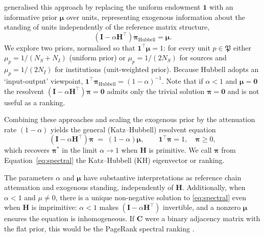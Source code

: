 \textcite{hubbellInputoutputApproachClique1965} generalised this approach by replacing
the uniform endowment $\mathbf{1}$ with an informative prior
$\boldsymbol{\mu}$ over units, representing exogenous information about
the standing of units independently of the reference matrix structure,
\[
	(\mathbf{I} - \alpha\mathbf{H}^\top)\boldsymbol{\pi}_\text{Hubbell} = \boldsymbol{\mu}.
\]
We explore two priors, normalised so that $\mathbf{1}^\top\boldsymbol{\mu}=1$:  for every unit $p\in\mathfrak{P}$ either $\mu_p = 1/(N_S+N_I)$ (uniform prior) or $\mu_p=1/(2N_S)$ for sources and $\mu_p=1/(2N_I)$ for institutions (unit-weighted prior). Because Hubbell adopts an `input-output' viewpoint, $\mathbf{1}^\top\boldsymbol{\pi}_{\text{Hubbell}} = (1-\alpha)^{-1}$. 
Note that if $\alpha < 1$ and $\boldsymbol{\mu}=\boldsymbol{0}$ the resolvent $(\mathbf{I}-\alpha\mathbf{H}^\top)\boldsymbol{\pi}=\mathbf{0}$ admits only the trivial solution $\boldsymbol{\pi}=\mathbf{0}$ and is not useful as a ranking.

Combining these approaches and scaling the exogenous prior by the attenuation rate $(1-\alpha)$ yields the general (Katz--Hubbell) resolvent equation
\begin{equation}
	(\mathbf{I} - \alpha\mathbf{H}^\top)\boldsymbol{\pi}
	\;=\;
	(1-\alpha)\boldsymbol{\mu},
	\qquad
	\mathbf{1}^\top\boldsymbol{\pi}=1,
	\quad
	\boldsymbol{\pi}\ge 0,
	\label{eq:spectral}
\end{equation}
which recovers $\boldsymbol{\pi}^*$ in the limit $\alpha\to 1$ when
$\mathbf{H}$ is primitive. We call $\boldsymbol{\pi}$ from Equation~\ref{eq:spectral} the Katz--Hubbell (KH) eigenvector or ranking.

The parameters $\alpha$ and $\boldsymbol{\mu}$ have substantive interpretations as reference chain attenuation and exogenous standing, independently of $\mathbf{H}$. Additionally, when $\alpha<1$ and $\mu \ne 0$, there is a unique non-negative solution to \eqref{eq:spectral} even when $\mathbf{H}$ is imprimitive: $\alpha<1$ makes $(\mathbf{I}-\alpha\mathbf{H}^\top)$ invertible, and a nonzero $\boldsymbol{\mu}$ ensures the equation is inhomogeneous. If $\mathbf{C}$ were a binary adjacency matrix with the flat prior, this would be the PageRank spectral ranking \citep{brinAnatomyLargescaleHypertextual1998}.

